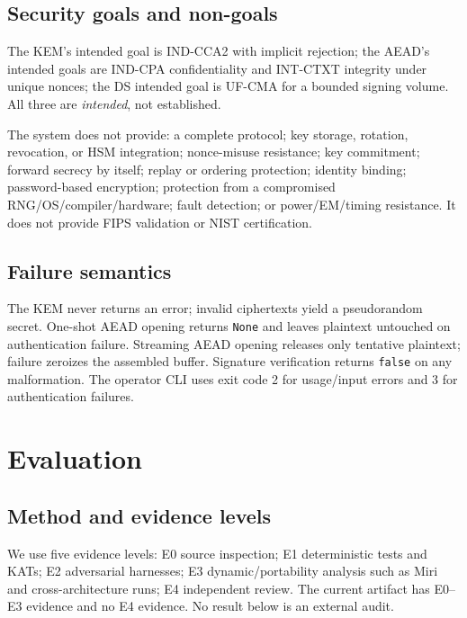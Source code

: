 \documentclass[runningheads]{llncs}
\begin{document}
\subsection{Security goals and non-goals}

The KEM's intended goal is IND-CCA2 with implicit rejection; the AEAD's
intended goals are IND-CPA confidentiality and INT-CTXT integrity under
unique nonces; the DS intended goal is UF-CMA for a bounded signing
volume.  All three are \emph{intended}, not established.

The system does not provide: a complete protocol; key storage, rotation,
revocation, or HSM integration; nonce-misuse resistance; key commitment;
forward secrecy by itself; replay or ordering protection; identity
binding; password-based encryption; protection from a compromised
RNG/OS/compiler/hardware; fault detection; or power/EM/timing
resistance.  It does not provide FIPS validation or NIST certification.

\subsection{Failure semantics}

The KEM never returns an error; invalid ciphertexts yield a
pseudorandom secret.  One-shot AEAD opening returns \texttt{None} and
leaves plaintext untouched on authentication failure.  Streaming AEAD
opening releases only tentative plaintext; failure zeroizes the
assembled buffer.  Signature verification returns \texttt{false} on any
malformation.  The operator CLI uses exit code 2 for usage/input errors
and 3 for authentication failures.

\section{Evaluation}
\label{sec:evaluation}

\subsection{Method and evidence levels}

We use five evidence levels: E0 source inspection; E1 deterministic
tests and KATs; E2 adversarial harnesses; E3 dynamic/portability
analysis such as Miri and cross-architecture runs; E4 independent
review.  The current artifact has E0--E3 evidence and no E4 evidence.
No result below is an external audit.
\end{document}
